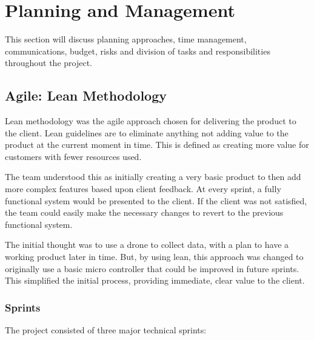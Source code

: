 \chapter{Planning and Management}

This section will discuss planning approaches, time management, communications, budget, risks and division of tasks and responsibilities throughout the project.

\section{Agile: Lean Methodology}

Lean methodology was the agile approach chosen for delivering the product to the client. Lean guidelines are to eliminate anything not adding value to the product at the current moment in time. This is defined as creating more value for customers with fewer resources \cite{LeanEnterpriseInstituteLeanMethodology} used.

The team understood this as initially creating a very basic product to then add more complex features based upon client feedback. At every sprint, a fully functional system would be presented to the client. If the client was not satisfied, the team could easily make the necessary changes to revert to the previous functional system. 

The initial thought was to use a drone to collect data, with a plan to have a working product later in time. But, by using lean, this approach was changed to originally use a basic micro controller that could be improved in future sprints. This simplified the initial process, providing immediate, clear value to the client.

\subsection{Sprints}

The project consisted of three major technical sprints:

